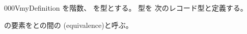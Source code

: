 \documentclass[index]{subfiles}
\begin{document}
\begin{myBlock}{000V}{myDefinition}
  を階数、
  を型とする。
  型を
  次のレコード型と定義する。
  \begin{myDisplayMath}
  \end{myDisplayMath}
  の要素をとの間の
  (equivalence)と呼ぶ。
\end{myBlock}
\end{document}
